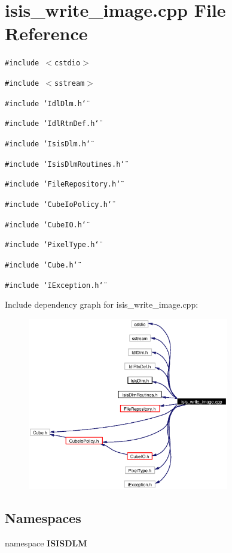 \section{isis\_\-write\_\-image.cpp File Reference}
\label{isis__write__image_8cpp}
{\tt \#include $<$cstdio$>$}\par
{\tt \#include $<$sstream$>$}\par
{\tt \#include \char`\"{}Idl\-Dlm.h\char`\"{}}\par
{\tt \#include \char`\"{}Idl\-Rtn\-Def.h\char`\"{}}\par
{\tt \#include \char`\"{}Isis\-Dlm.h\char`\"{}}\par
{\tt \#include \char`\"{}Isis\-Dlm\-Routines.h\char`\"{}}\par
{\tt \#include \char`\"{}File\-Repository.h\char`\"{}}\par
{\tt \#include \char`\"{}Cube\-Io\-Policy.h\char`\"{}}\par
{\tt \#include \char`\"{}Cube\-IO.h\char`\"{}}\par
{\tt \#include \char`\"{}Pixel\-Type.h\char`\"{}}\par
{\tt \#include \char`\"{}Cube.h\char`\"{}}\par
{\tt \#include \char`\"{}i\-Exception.h\char`\"{}}\par


Include dependency graph for isis\_\-write\_\-image.cpp:\begin{figure}[H]
\begin{center}
\leavevmode
\includegraphics[width=249pt]{isis__write__image_8cpp__incl}
\end{center}
\end{figure}
\subsection*{Namespaces}
\begin{CompactItemize}
\item 
namespace {\bf ISISDLM}
\end{CompactItemize}
